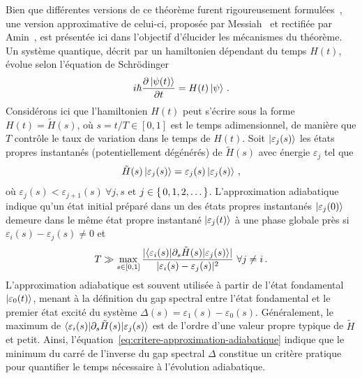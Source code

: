 Bien que différentes versions de ce théorème furent rigoureusement formulées~\cite{albashAdiabaticQuantumComputation2018}, une version approximative de celui-ci, proposée par Messiah~\cite{messiahQuantumMechanics1961} et rectifiée par Amin~\cite{aminConsistencyAdiabaticTheorem2009}, est présentée ici dans l'objectif d'élucider les mécanismes du théorème. Un système quantique, décrit par un hamiltonien dépendant du temps $H(t)$, évolue selon l'équation de Schrödinger
\begin{equation}
    i \hbar \frac{\partial \ket{\psi(t)}}{\partial t} = H(t) \ket{\psi} \,.
 \end{equation}
Considérons ici que l'hamiltonien $H(t)$ peut s'écrire sous la forme $H(t) = \tilde{H}(s)$, où $s=t/T \in [0,1]$ est le temps adimensionnel, de manière que $T$ contrôle le taux de variation dans le temps de $H(t)$. Soit $\ket{\varepsilon_{j} (s)}$ les états propres instantanés (potentiellement dégénérés) de $\tilde{H}(s)$ avec énergie $\varepsilon_{j}$ tel que
\begin{equation}
   \tilde{H}(s) \ket{\varepsilon_{j}(s)} = \varepsilon_{j}(s) \ket{\varepsilon_{j}(s)} \,,
\end{equation}
où $\varepsilon_{j}(s) < \varepsilon_{j+1}(s) \ \forall j,s$ et $j \in \set{ 0, 1, 2, \dots }$. L'approximation adiabatique indique qu'un état initial préparé dans un des états propres instantanés $\ket{\varepsilon_{j}(0)}$ demeure dans le même état propre instantané $\ket{\varepsilon_{j}(t)}$ à une phase globale près si $\varepsilon_{i}(s) - \varepsilon_{j}(s) \neq  0$ et
\begin{equation}
    \label{eq:critere-approximation-adiabatique}
    T \gg \max_{s \in [0,1]} \frac{\lvert \braket{ \varepsilon_{i}(s) | \partial_{s} \tilde{H}(s) | \varepsilon_{j}(s) } \rvert }{\lvert \varepsilon_{i}(s) - \varepsilon_{j}(s) \rvert^{2} } \ \forall j \neq i \,.
\end{equation}
L'approximation adiabatique est souvent utilisée à partir de l'état fondamental $\ket{\varepsilon_{0}(t)}$, menant à la définition du gap spectral entre l'état fondamental et le premier état excité du système $\Delta(s) = \varepsilon_{1}(s) - \varepsilon_{0}(s)$. Généralement, le maximum de $\braket{ \varepsilon_{i}(s) | \partial_{s} \tilde{H}(s) | \varepsilon_{j}(s)}$ est de l'ordre d'une valeur propre typique de $\tilde{H}$ et petit. Ainsi, l'équation~\ref{eq:critere-approximation-adiabatique} indique que le minimum du carré de l'inverse du gap spectral $\Delta$ constitue un critère pratique pour quantifier le temps nécessaire à l'évolution adiabatique.

